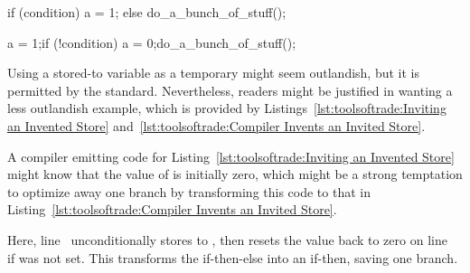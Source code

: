 \begin{listing}[tbp]
\begin{fcvlabel}
\begin{VerbatimL}[commandchars=\\\{\}]
if (condition)
	a = 1;
else
	do_a_bunch_of_stuff();
\end{VerbatimL}
\end{fcvlabel}
\caption{Inviting an Invented Store}
\label{lst:toolsoftrade:Inviting an Invented Store}
\end{listing}

\begin{listing}[tbp]
\begin{fcvlabel}
\begin{VerbatimL}[commandchars=\\\[\]]
a = 1;
if (!condition) {
	a = 0;
	do_a_bunch_of_stuff();
}
\end{VerbatimL}
\end{fcvlabel}
\caption{Compiler Invents an Invited Store}
\label{lst:toolsoftrade:Compiler Invents an Invited Store}
\end{listing}

Using a stored-to variable as a temporary might seem outlandish,
but it is permitted by the standard.
Nevertheless, readers might be justified in wanting a less
outlandish example, which is provided by
Listings~\ref{lst:toolsoftrade:Inviting an Invented Store}
and~\ref{lst:toolsoftrade:Compiler Invents an Invited Store}.

A compiler emitting code for
Listing~\ref{lst:toolsoftrade:Inviting an Invented Store}
might know that the value of  is initially zero,
which might be a strong temptation to optimize away one branch
by transforming this code to that in
Listing~\ref{lst:toolsoftrade:Compiler Invents an Invited Store}.
\begin{fcvref}
Here, line~ unconditionally stores  to , then
resets the value back to zero on
line~ if  was not set.
This transforms the if-then-else into an if-then, saving one branch.
\end{fcvref}

